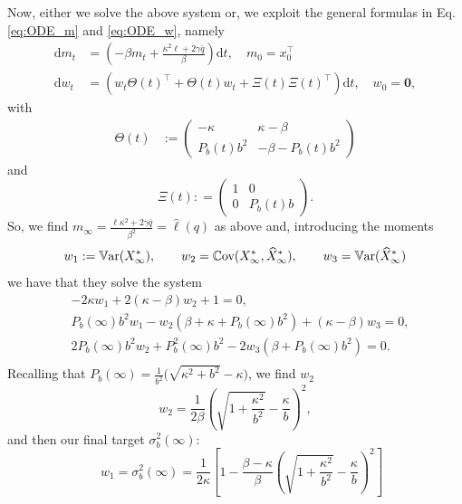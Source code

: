 \documentclass[a4paper,10pt]{article}
\newcommand{\D}{\mathrm{d}}
\theoremstyle{definition}
\theoremstyle{plain}
\numberwithin{equation}{section}
\begin{document}
Now, either we solve the above system or, we exploit the general formulas in Eq. \eqref{eq:ODE_m} and \eqref{eq:ODE_w}, namely
\begin{align}
    \D m_t & = 
    \left(
   - \beta   m_t + \frac{\kappa^2 \ell + 2 \gamma \bar q}{\beta}
    \right) \D t , \quad m_0 = x_0^\top \\ 
    \D w_t & = ( w_t \Theta(t)^\top + \Theta(t) w_t +\Xi(t)\Xi(t)^\top)  \D t ,  \quad w_0 = \mathbf 0,
\end{align}
with
\begin{align*}  \Theta(t) & :=
\begin{pmatrix}
        -\kappa & \kappa - \beta \\
        P_b(t) b^2 & -\beta - P_b(t)b^2
    \end{pmatrix}
    \end{align*}
    and
    \[ \Xi(t) : =
    \begin{pmatrix}
        1 & 0\\
        0 & P_b(t)b 
    \end{pmatrix}.
    \]
So, we find $m_\infty = \frac{\ell \kappa^2 + 2\gamma \bar q}{\beta^2} = \hat \ell(q)$ as above and, introducing the moments
$$
w_1 := \mathbb{V}\text{\rm ar}(X_\infty^*) , \qquad w_2 = \mathbb{C}\text{\rm ov}(X_\infty^*, {\widehat X_\infty}^*), \qquad w_3 = \mathbb{V}\text{\rm ar}({\widehat X_\infty}^*)
$$
we have that they solve the system
\begin{align*}
& - 2 \kappa w_1+ 2 (\kappa - \beta)w_2 +1 =0,\\
& P_b(\infty) b^2w_1- w_2 (\beta + \kappa + P_b(\infty) b^2) + (\kappa - \beta) w_3 =0 , \\
& 2 P_b(\infty) b^2 w_2 + P_b^2(\infty) b^2 - 2 w_3 (\beta + P_b(\infty) b^2) = 0.\\ 
\end{align*}
Recalling that $P_{b}(\infty)  = \frac{1}{b^2}\big(\sqrt{ \kappa^2 + b^2 } -\kappa\big)$, we find $w_2$
$$
w_2 = \frac{1}{2\beta} \left(  \sqrt{1 + \frac{\kappa^2}{b^2}} - \frac{\kappa}{b} \right)^2, 
$$
and then our final target $\sigma_b^2(\infty)$:
$$
\quad w_1 = \sigma_b^2(\infty)=\frac{1}{2\kappa} \left[ 1 - \frac{\beta - \kappa}{\beta}   \left(  \sqrt{1 + \frac{\kappa^2}{b^2}} - \frac{\kappa}{b} \right)^2 \right]
$$
\end{document}
